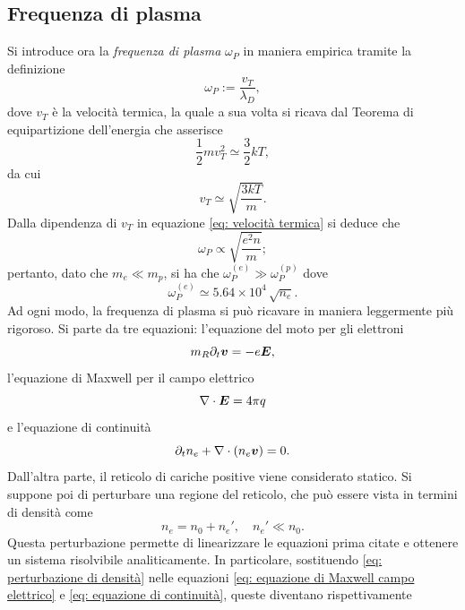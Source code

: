 \subsection{Frequenza di plasma}
Si introduce ora la \emph{frequenza di plasma} $\omega_P$ in maniera empirica tramite la definizione 
\begin{equation}
    \omega_P := \frac{v_T}{\lambda_D},
\end{equation}
dove $v_T$ è la velocità termica, la quale a sua volta si ricava dal Teorema di equipartizione dell'energia che asserisce
\begin{equation}
    \frac{1}{2}mv_T^2 \simeq \frac{3}{2}kT,
\end{equation}
da cui
\begin{equation}
\label{eq: velocità termica}
    v_T \simeq \sqrt{\frac{3kT}{m}}.
\end{equation}
Dalla dipendenza di $v_T$ in equazione \eqref{eq: velocità termica} si deduce che 
\begin{equation}
    \omega_P \propto \sqrt{\frac{e^2n}{m}};
\end{equation}
pertanto, dato che $m_e \ll m_p$, si ha che $\omega_P^{(e)} \gg \omega_P^{(p)}$ dove 
\begin{equation}
    \omega_P^{(e)} \simeq 5.64 \times 10^4\,\sqrt{n_e}.
\end{equation}
Ad ogni modo, la frequenza di plasma si può ricavare in maniera leggermente più rigoroso. Si parte da tre equazioni: l'equazione del moto per gli elettroni
\begin{equation}
\label{eq: equazione del moto elettroni}
    m_R\partial_t\bm{v} = -e\bm{E},
\end{equation}
l'equazione di Maxwell per il campo elettrico 
\begin{equation}
\label{eq: equazione di Maxwell campo elettrico}
    \nabla\cdot\bm{E} = 4\pi q
\end{equation}
e l'equazione di continuità
\begin{equation}
\label{eq: equazione di continuità}
    \partial_tn_e + \nabla\cdot (n_e\bm{v}) = 0.
\end{equation}
Dall'altra parte, il reticolo di cariche positive viene considerato statico. Si suppone poi di perturbare una regione del reticolo, che può essere vista in termini di densità come
\begin{equation}
\label{eq: perturbazione di densità}
    n_e = n_0 + n_e',\quad n_e' \ll n_0.
\end{equation}
Questa perturbazione permette di linearizzare le equazioni prima citate e ottenere un sistema risolvibile analiticamente. In particolare, sostituendo \eqref{eq: perturbazione di densità} nelle equazioni \eqref{eq: equazione di Maxwell campo elettrico} e \eqref{eq: equazione di continuità}, queste diventano rispettivamente
